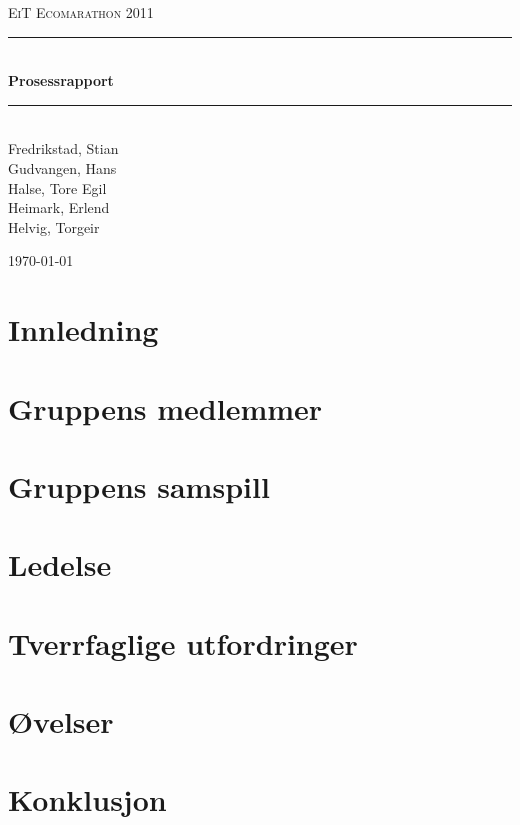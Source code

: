 \documentclass[a4paper,11pt]{report}
\newcommand{\HRule}{\rule{\linewidth}{0.5mm}}
\begin{document}
\begin{titlepage}

\begin{center}
\textsc{\LARGE EiT Ecomarathon 2011}\\[1.5cm]

\HRule \\[0.4cm]
{ \huge \bfseries Prosessrapport}\\[0.4cm]
\HRule \\[1.5cm] 

Fredrikstad, Stian\\
Gudvangen, Hans\\
Halse, Tore Egil\\
Heimark, Erlend\\
Helvig, Torgeir\\

\vfill
 
{\large \today}

\end{center}
\end{titlepage}
\cleardoublepage
{}
\tableofcontents
\clearpage

\chapter{Innledning}

\chapter{Gruppens medlemmer}





\chapter{Gruppens samspill}



\chapter{Ledelse}

\chapter{Tverrfaglige utfordringer}

\chapter{Øvelser}

\chapter{Konklusjon}


\appendix




\clearpage 
 
 
\end{document}
